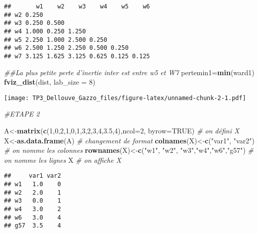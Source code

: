 \documentclass[
]{article}
\newenvironment{Shaded}{\begin{snugshade}}{\end{snugshade}}
\newcommand{\CommentTok}[1]{\textcolor[rgb]{0.56,0.35,0.01}{\textit{#1}}}
\newcommand{\DataTypeTok}[1]{\textcolor[rgb]{0.13,0.29,0.53}{#1}}
\newcommand{\DecValTok}[1]{\textcolor[rgb]{0.00,0.00,0.81}{#1}}
\newcommand{\FloatTok}[1]{\textcolor[rgb]{0.00,0.00,0.81}{#1}}
\newcommand{\KeywordTok}[1]{\textcolor[rgb]{0.13,0.29,0.53}{\textbf{#1}}}
\newcommand{\NormalTok}[1]{#1}
\newcommand{\OtherTok}[1]{\textcolor[rgb]{0.56,0.35,0.01}{#1}}
\newcommand{\StringTok}[1]{\textcolor[rgb]{0.31,0.60,0.02}{#1}}
\begin{document}
\begin{verbatim}
##       w1    w2    w3    w4    w5    w6
## w2 0.250                              
## w3 0.250 0.500                        
## w4 1.000 0.250 1.250                  
## w5 2.250 1.000 2.500 0.250            
## w6 2.500 1.250 2.250 0.500 0.250      
## w7 3.125 1.625 3.125 0.625 0.125 0.125
\end{verbatim}

\begin{Shaded}
\begin{Highlighting}[]
\CommentTok{##La plus petite perte d'inertie inter est entre w5 et W7}
\NormalTok{pertemin1=}\KeywordTok{min}\NormalTok{(ward1)}
\KeywordTok{fviz_dist}\NormalTok{(dist, }\DataTypeTok{lab_size =} \DecValTok{8}\NormalTok{)}
\end{Highlighting}
\end{Shaded}

\texttt{[image: TP3\_Dellouve\_Gazzo\_files/figure-latex/unnamed-chunk-2-1.pdf]}

\begin{Shaded}
\begin{Highlighting}[]
\CommentTok{#ETAPE 2}

\NormalTok{A<-}\KeywordTok{matrix}\NormalTok{(}\KeywordTok{c}\NormalTok{(}\DecValTok{1}\NormalTok{,}\DecValTok{0}\NormalTok{,}\DecValTok{2}\NormalTok{,}\DecValTok{1}\NormalTok{,}\DecValTok{0}\NormalTok{,}\DecValTok{1}\NormalTok{,}\DecValTok{3}\NormalTok{,}\DecValTok{2}\NormalTok{,}\DecValTok{3}\NormalTok{,}\DecValTok{4}\NormalTok{,}\FloatTok{3.5}\NormalTok{,}\DecValTok{4}\NormalTok{),}\DataTypeTok{ncol=}\DecValTok{2}\NormalTok{, }\DataTypeTok{byrow=}\OtherTok{TRUE}\NormalTok{) }\CommentTok{# on défini X}
\NormalTok{X<-}\KeywordTok{as.data.frame}\NormalTok{(A) }\CommentTok{# changement de format}
\KeywordTok{colnames}\NormalTok{(X)<-}\KeywordTok{c}\NormalTok{(}\StringTok{"var1"}\NormalTok{, }\StringTok{"var2"}\NormalTok{) }\CommentTok{# on nomme les colonnes}
\KeywordTok{rownames}\NormalTok{(X)<-}\KeywordTok{c}\NormalTok{(}\StringTok{"w1"}\NormalTok{, }\StringTok{"w2"}\NormalTok{, }\StringTok{"w3"}\NormalTok{,}\StringTok{"w4"}\NormalTok{,}\StringTok{"w6"}\NormalTok{,}\StringTok{"g57"}\NormalTok{) }\CommentTok{# on nomme les lignes}
\NormalTok{X }\CommentTok{# on affiche X}
\end{Highlighting}
\end{Shaded}

\begin{verbatim}
##     var1 var2
## w1   1.0    0
## w2   2.0    1
## w3   0.0    1
## w4   3.0    2
## w6   3.0    4
## g57  3.5    4
\end{verbatim}
\end{document}
